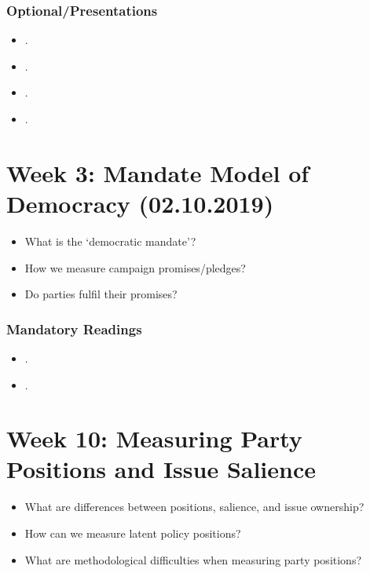 \documentclass[abstract=on,parskip=full,headings=standardclasses,fontsize=11pt,paper=a4]{scrartcl}
\begin{document}
\subsubsection*{Optional/Presentations}
\begin{itemize}
\item {}.
\item {}.
\item {}.
\item {}.
\end{itemize}



\section{Week 3:  Mandate Model of Democracy (02.10.2019)}


\begin{itemize}
\renewcommand\labelitemi{--}
\item What is the `democratic mandate'? 
\item How we measure campaign promises/pledges?
\item Do parties fulfil their promises?
\end{itemize}

\subsubsection*{Mandatory Readings}
\begin{itemize}
\item {}.
\item {}.
\end{itemize}



\section{Week 10:   Measuring Party Positions and Issue Salience}


\begin{itemize}
\renewcommand\labelitemi{--}
\item What are differences between positions, salience, and issue ownership?
\item How can we measure latent policy positions? 
\item What are methodological difficulties when measuring party positions?
\end{itemize}
\end{document}
